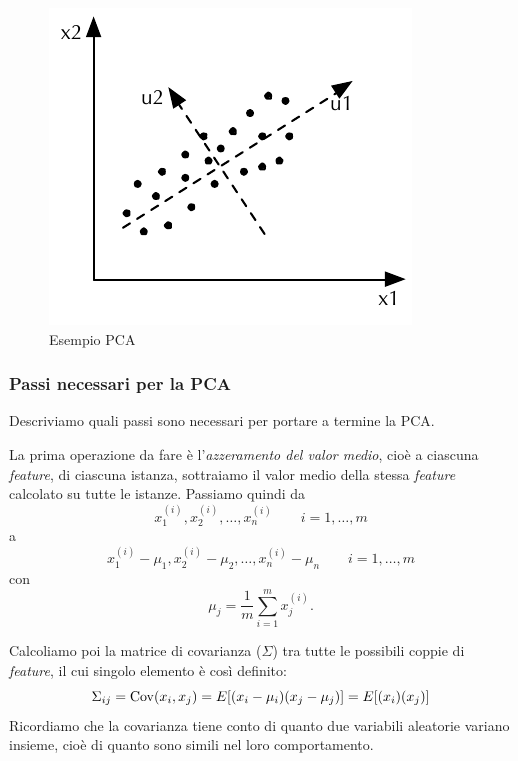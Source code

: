 \begin{figure}[tbp]
\centering
  \includegraphics{images/esempio_pca}
  \caption{Esempio PCA}
  \label{fig:esempio_pca}
\end{figure}

\subsubsection{Passi necessari per la PCA}
Descriviamo quali passi sono necessari per portare a termine la PCA.

La prima operazione da fare è l'\emph{azzeramento del valor medio}, cioè a ciascuna \emph{feature}, di ciascuna istanza, sottraiamo il valor medio della stessa \emph{feature} calcolato su tutte le istanze. Passiamo quindi da
\begin{equation*}
x^{(i)}_1, x^{(i)}_2, \dots, x^{(i)}_n \qquad i = 1, \dots, m
\end{equation*}
a
\begin{equation*}
x^{(i)}_1 - \mu_1, x^{(i)}_2-\mu_2, \dots, x^{(i)}_n-\mu_n \qquad i = 1, \dots, m
\end{equation*}
con
\begin{equation*}
\mu_j = \frac{1}{m}\sum_{i=1}^m x^{(i)}_j.
\end{equation*}

Calcoliamo poi la matrice di covarianza ($\Sigma$) tra tutte le possibili coppie di \emph{feature}, il cui singolo elemento è così definito:
\begin{dmath*}
\Sigma_{ij} = \cov(x_i, x_j)
= E[(x_i-\mu_i)(x_j-\mu_j)]
= E[(x_i)( x_j)]
\end{dmath*}
Ricordiamo che la covarianza tiene conto di quanto due variabili aleatorie variano insieme, cioè di quanto sono simili nel loro comportamento.

